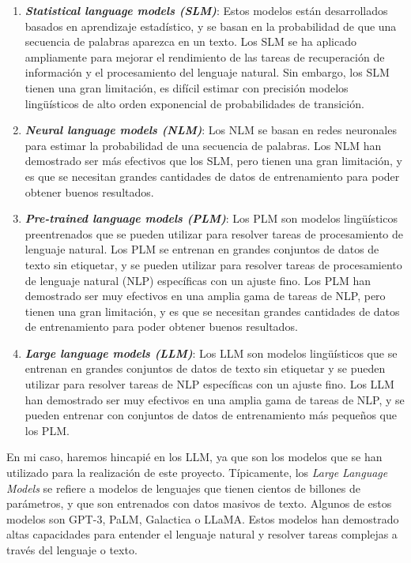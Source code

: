 \begin{enumerate}
    \item \textit{\textbf{Statistical language models (SLM)}}: Estos modelos están desarrollados basados en aprendizaje
        estadístico, y se basan en la probabilidad de que una secuencia de palabras aparezca en un texto. Los
        SLM se ha aplicado ampliamente para mejorar el rendimiento de las tareas de recuperación de información
        y el procesamiento del lenguaje natural. Sin embargo, los SLM tienen una gran limitación, es difícil
        estimar con precisión modelos lingüísticos de alto orden exponencial de probabilidades de transición.
    \item \textit{\textbf{Neural language models (NLM)}}: Los NLM se basan en redes neuronales para estimar la probabilidad
        de una secuencia de palabras. Los NLM han demostrado ser más efectivos que los SLM, pero tienen una gran
        limitación, y es que se necesitan grandes cantidades de datos de entrenamiento para poder obtener buenos
        resultados.
    \item \textit{\textbf{Pre-trained language models (PLM)}}: Los PLM son modelos lingüísticos preentrenados que se pueden
        utilizar para resolver tareas de procesamiento de lenguaje natural. Los PLM se entrenan en grandes conjuntos
        de datos de texto sin etiquetar, y se pueden utilizar para resolver tareas de procesamiento de lenguaje
        natural (NLP) específicas con un ajuste fino. Los PLM han demostrado ser muy efectivos en una amplia gama
        de tareas de NLP, pero tienen una gran limitación, y es que se necesitan grandes cantidades de datos de
        entrenamiento para poder obtener buenos resultados.
    \item \textit{\textbf{Large language models (LLM)}}: Los LLM son modelos lingüísticos que se entrenan en grandes conjuntos
        de datos de texto sin etiquetar y se pueden utilizar para resolver tareas de NLP específicas con un ajuste
        fino. Los LLM han demostrado ser muy efectivos en una amplia gama de tareas de NLP, y se pueden entrenar
        con conjuntos de datos de entrenamiento más pequeños que los PLM.
\end{enumerate}

En mi caso, haremos hincapié en los LLM, ya que son los modelos que se han utilizado para la realización de este
proyecto. Típicamente, los \textit{Large Language Models} se refiere a modelos de lenguajes que
tienen cientos de billones de parámetros, y que son entrenados con datos masivos de texto.
Algunos de estos modelos son GPT-3, PaLM, Galactica o LLaMA. Estos modelos han demostrado altas
capacidades para entender el lenguaje natural y resolver tareas complejas a través del lenguaje o texto.

